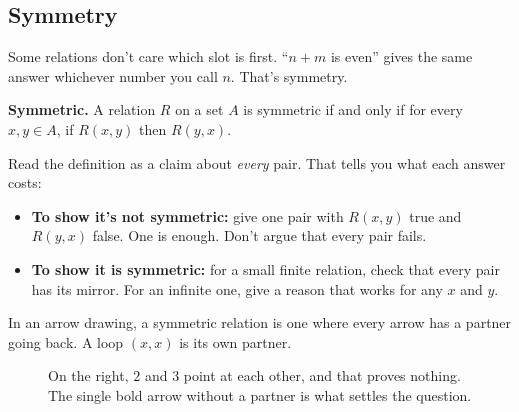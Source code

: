 \subsection{Symmetry}

Some relations don't care which slot is first. ``$n+m$ is even'' gives the same answer whichever number you call $n$. That's symmetry.

\begin{notebox}
\textbf{Symmetric.} A relation $R$ on a set $A$ is symmetric if and only if for every $x,y\in A$, if $R(x,y)$ then $R(y,x)$.
\end{notebox}

Read the definition as a claim about \emph{every} pair. That tells you what each answer costs:
\begin{itemize}
\item \textbf{To show it's not symmetric:} give one pair with $R(x,y)$ true and $R(y,x)$ false. One is enough. Don't argue that every pair fails.
\item \textbf{To show it is symmetric:} for a small finite relation, check that every pair has its mirror. For an infinite one, give a reason that works for any $x$ and $y$.
\end{itemize}

In an arrow drawing, a symmetric relation is one where every arrow has a partner going back. A loop $(x,x)$ is its own partner.

\begin{figure}[H]
\centering
{}
\caption{On the right, $2$ and $3$ point at each other, and that proves nothing. The single bold arrow without a partner is what settles the question.}
\end{figure}

